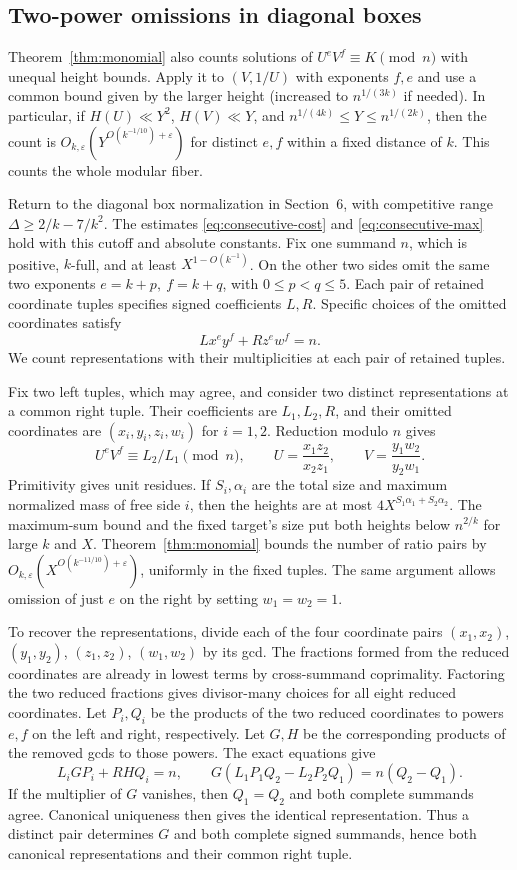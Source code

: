 \documentclass[11pt,reqno]{amsart}
\newcommand{\eps}{\varepsilon}
\begin{document}
\subsection{Two-power omissions in diagonal boxes}\label{sec:two-power-diagonal}

Theorem~\ref{thm:monomial} also counts solutions of
\(U^e V^f\equiv K\pmod n\) with unequal height bounds.
Apply it to \((V,1/U)\) with exponents \(f,e\) and use
a common bound given by the larger height (increased to
\(n^{1/(3k)}\) if needed). In particular, if \(H(U)\ll Y^2\),
\(H(V)\ll Y\), and \(n^{1/(4k)}\le Y\le n^{1/(2k)}\), then the count is
\(O_{k,\eps}(Y^{O(k^{-1/10})+\eps})\) for distinct \(e,f\)
within a fixed distance of \(k\). This counts the whole
modular fiber.

Return to the diagonal box normalization in Section~6,
with competitive range \(\Delta\ge2/k-7/k^2\). The estimates
\eqref{eq:consecutive-cost} and \eqref{eq:consecutive-max} hold
with this cutoff and absolute constants. Fix one summand \(n\),
which is positive, \(k\)-full, and at least \(X^{1-O(k^{-1})}\).
On the other two sides omit the same two exponents
\(e=k+p,\ f=k+q\), with \(0\le p<q\le5\).
Each pair of retained coordinate tuples specifies signed
coefficients \(L,R\). Specific choices of the omitted
coordinates satisfy
\[
                        Lx^e y^f+Rz^e w^f=n.
\]
We count representations with their multiplicities at each
pair of retained tuples.

Fix two left tuples, which may agree, and consider two
distinct representations at a common right tuple. Their
coefficients are \(L_1,L_2,R\), and their omitted coordinates
are \((x_i,y_i,z_i,w_i)\) for \(i=1,2\).
Reduction modulo \(n\) gives
\[
 U^e V^f\equiv L_2/L_1\pmod n,\qquad
 U=\frac{x_1z_2}{x_2z_1},\qquad V=\frac{y_1w_2}{y_2w_1}.
\]
Primitivity gives unit residues. If \(S_i,\alpha_i\) are the
total size and maximum normalized mass of free side \(i\), then
the heights are at most \(4X^{S_1\alpha_1+S_2\alpha_2}\).
The maximum-sum bound and the fixed target's size put both
heights below \(n^{2/k}\) for large \(k\) and \(X\).
Theorem~\ref{thm:monomial} bounds the number of ratio pairs by
\(O_{k,\eps}(X^{O(k^{-11/10})+\eps})\), uniformly in the fixed
tuples. The same argument allows omission of just \(e\) on
the right by setting \(w_1=w_2=1\).

To recover the representations, divide each of the four coordinate
pairs \((x_1,x_2)\), \((y_1,y_2)\), \((z_1,z_2)\), \((w_1,w_2)\)
by its gcd. The fractions formed from the reduced coordinates
are already in lowest terms by cross-summand coprimality.
Factoring the two reduced fractions gives divisor-many choices
for all eight reduced coordinates. Let \(P_i,Q_i\) be the products
of the two reduced coordinates to powers \(e,f\) on the left and
right, respectively. Let \(G,H\) be the corresponding products
of the removed gcds to those powers. The exact equations give
\[
 L_iGP_i+RH Q_i=n,\qquad
 G(L_1P_1Q_2-L_2P_2Q_1)=n(Q_2-Q_1).
\]
If the multiplier of \(G\) vanishes, then \(Q_1=Q_2\) and both
complete summands agree. Canonical uniqueness then gives the
identical representation. Thus a distinct pair determines \(G\)
and both complete signed summands, hence both canonical
representations and their common right tuple.
\end{document}
